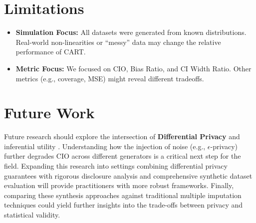 \section{Limitations}
\label{sec:reg-limitations}
\begin{itemize}
    \item \textbf{Simulation Focus:} All datasets were generated from known distributions. Real-world non-linearities or ``messy'' data may change the relative performance of CART.
    \item \textbf{Metric Focus:} We focused on CIO, Bias Ratio, and CI Width Ratio. Other metrics (e.g., coverage, MSE) might reveal different tradeoffs.
\end{itemize}

\section{Future Work}
\label{sec:reg-future-work}
Future research should explore the intersection of \textbf{Differential Privacy} and inferential utility \cite{dwork2006, jordon2018}. Understanding how the injection of noise (e.g., $\epsilon$-privacy) further degrades CIO across different generators is a critical next step for the field. Expanding this research into settings combining differential privacy guarantees with rigorous disclosure analysis \cite{abowd2003} and comprehensive synthetic dataset evaluation \cite{bellovin2019, bowen2020, hsu2021} will provide practitioners with more robust frameworks. Finally, comparing these synthesis approaches against traditional multiple imputation techniques \cite{rubin1987, raghunathan2003} could yield further insights into the trade-offs between privacy and statistical validity.
